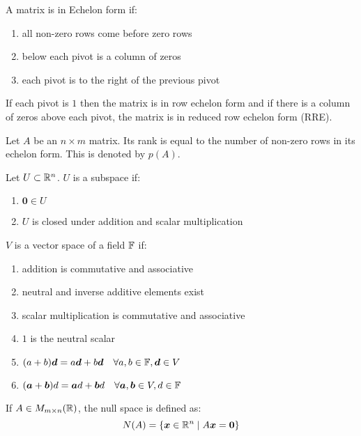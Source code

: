 \documentclass[a4paper,10pt]{article}
\begin{document}
\begin{defn}
	A matrix is in Echelon form if:
	\begin{enumerate}
		\item all non-zero rows come before zero rows
		\item below each pivot is a column of zeros
		\item each pivot is to the right of the previous pivot
	\end{enumerate}

	If each pivot is $1$ then the matrix is in row echelon form and if
	there is a column of zeros above each pivot, the matrix is in reduced
	row echelon form (RRE).
\end{defn}

\begin{defn}[Rank]
	Let $A$ be an $n \times m$ matrix. Its rank is equal to the number of
	non-zero rows in its echelon form. This is denoted by $p(A)$.
\end{defn}

\begin{defn}[Subspace]
	Let $U \subset \mathbb{R}^n$. $U$ is a subspace if:
	\begin{enumerate}
		\item $\bm{0} \in U$
		\item $U$ is closed under addition and scalar multiplication
	\end{enumerate}
\end{defn}

\begin{defn}
	$V$ is a vector space of a field $\mathbb{F}$ if:
	\begin{enumerate}
		\item addition is commutative and associative
		\item neutral and inverse additive elements exist
		\item scalar multiplication is commutative and associative
		\item $1$ is the neutral scalar
		\item $(a+b)\bm{d} = a\bm{d} + b\bm{d} \quad \forall a,b \in \mathbb{F}, \bm{d} \in V$
		\item $(\bm{a} + \bm{b})d = \bm{a}d + \bm{b}d \quad \forall \bm{a},\bm{b} \in V, d \in \mathbb{F}$
	\end{enumerate}
\end{defn}

\begin{defn}
	If $A \in M_{m \times n}(\mathbb{R})$, the null space is defined as:
	\[
		N(A) = \{ \bm{x} \in \mathbb{R}^n \mid A\bm{x} = \bm{0} \}
	\]
\end{defn}
\end{document}
